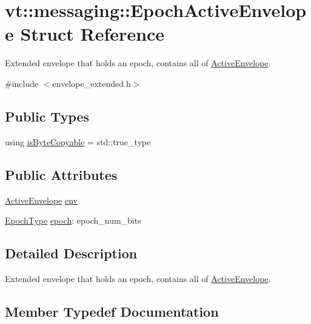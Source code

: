 \hypertarget{structvt_1_1messaging_1_1_epoch_active_envelope}{}\section{vt\+:\+:messaging\+:\+:Epoch\+Active\+Envelope Struct Reference}
\label{structvt_1_1messaging_1_1_epoch_active_envelope}


Extended envelope that holds an epoch, contains all of {\ttfamily \hyperlink{structvt_1_1messaging_1_1_active_envelope}{Active\+Envelope}}.  




{\ttfamily \#include $<$envelope\+\_\+extended.\+h$>$}

\subsection*{Public Types}
\begin{DoxyCompactItemize}
\item 
using \hyperlink{structvt_1_1messaging_1_1_epoch_active_envelope_acc191b9182733db346b508d4c77c2e58}{is\+Byte\+Copyable} = std\+::true\+\_\+type
\end{DoxyCompactItemize}
\subsection*{Public Attributes}
\begin{DoxyCompactItemize}
\item 
\hyperlink{structvt_1_1messaging_1_1_active_envelope}{Active\+Envelope} \hyperlink{structvt_1_1messaging_1_1_epoch_active_envelope_aba54092b517b6ade61d737d78aed8d3e}{env}
\item 
\hyperlink{namespacevt_a985a5adf291c34a3ca263b3378388236}{Epoch\+Type} \hyperlink{structvt_1_1messaging_1_1_epoch_active_envelope_ab2888fbf6456065ddf86656a1ed09329}{epoch}\+: epoch\+\_\+num\+\_\+bits
\end{DoxyCompactItemize}


\subsection{Detailed Description}
Extended envelope that holds an epoch, contains all of {\ttfamily \hyperlink{structvt_1_1messaging_1_1_active_envelope}{Active\+Envelope}}. 

\subsection{Member Typedef Documentation}
\mbox{\label{structvt_1_1messaging_1_1_epoch_active_envelope_acc191b9182733db346b508d4c77c2e58}} 
